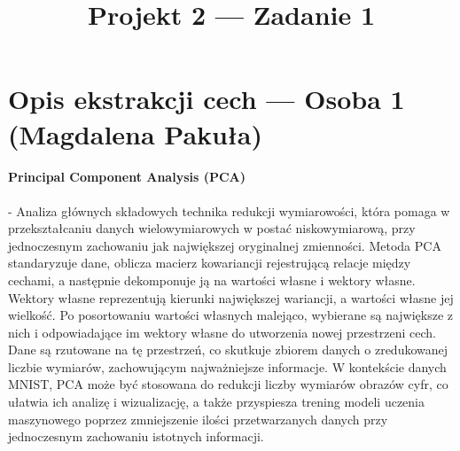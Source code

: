 \documentclass[10pt]{article}
\title{Projekt 2 --- Zadanie 1}
\begin{document}
\maketitle
\normalsize
\section{Opis ekstrakcji cech --- Osoba 1 (Magdalena Pakuła)}

\paragraph*{Principal Component Analysis (PCA)} - Analiza głównych składowych technika redukcji wymiarowości, która pomaga w przekształcaniu danych wielowymiarowych w postać niskowymiarową, przy jednoczesnym zachowaniu jak największej oryginalnej zmienności.
Metoda PCA standaryzuje dane, oblicza macierz kowariancji rejestrującą relacje między cechami, a następnie dekomponuje ją na wartości własne i wektory własne. Wektory własne reprezentują kierunki największej wariancji, a wartości własne jej wielkość. Po posortowaniu wartości własnych malejąco, wybierane są największe z nich i odpowiadające im wektory własne do utworzenia nowej przestrzeni cech. Dane są rzutowane na tę przestrzeń, co skutkuje zbiorem danych o zredukowanej liczbie wymiarów, zachowującym najważniejsze informacje.
W kontekście danych MNIST, PCA może być stosowana do redukcji liczby wymiarów obrazów cyfr, co ułatwia ich analizę i wizualizację, a także przyspiesza trening modeli uczenia maszynowego poprzez zmniejszenie ilości przetwarzanych danych przy jednoczesnym zachowaniu istotnych informacji.
\end{document}
